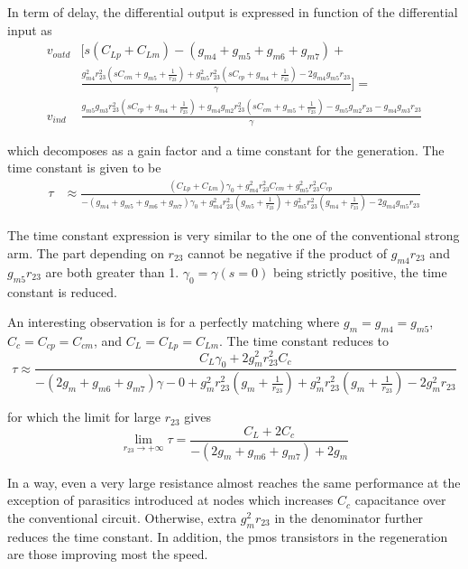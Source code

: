 In term of delay, the differential output is expressed in function of the differential input as
\small
\begin{align}
    v_{outd} & \Biggl[ s \left( C_{Lp}+C_{Lm}\right) -(g_{m4}+g_{m5}+g_{m6}+g_{m7})+ \\
    & \frac{g_{m4}^2 r_{23}^2 \left( sC_{cm}+g_{m5}+\frac{1}{r_{23}} \right) +g_{m5}^2 r_{23}^2 \left( sC_{cp}+g_{m4}+\frac{1}{r_{23}} \right) - 2g_{m4}g_{m5}r_{23}}{\gamma} \Biggr] = \nonumber \\
    v_{ind} & \frac{g_{m5}g_{m3}r_{23}^2 \left( sC_{cp}+g_{m4}+\frac{1}{r_{23}} \right) +g_{m4}g_{m2}r_{23}^2 \left( sC_{cm}+g_{m5}+\frac{1}{r_{23}} \right) -g_{m5}g_{m2}r_{23}-g_{m4}g_{m3}r_{23}}{\gamma} \nonumber
\end{align}
\normalsize

which decomposes as a gain factor and a time constant for the generation. The time constant is given to be
\begin{align}
\tau &\approx \frac{\left(C_{Lp}+C_{Lm}\right)\gamma_0+g_{m4}^2r_{23}^2C_{cm}+g_{m5}^2r_{23}^2C_{cp}}{-(g_{m4}+g_{m5}+g_{m6}+g_{m7})\gamma_0+g_{m4}^2 r_{23}^2 \left(g_{m5}+\frac{1}{r_{23}} \right) +g_{m5}^2 r_{23}^2 \left(g_{m4}+\frac{1}{r_{23}} \right) - 2g_{m4}g_{m5}r_{23}}
\end{align}

The time constant expression is very similar to the one of the conventional strong arm. The part depending on \(r_{23}\) cannot be negative if the product of \(g_{m4}r_{23}\) and \(g_{m5}r_{23}\) are both greater than 1. \(\gamma_0 = \gamma(s=0) \) being strictly positive, the time constant is reduced.

An interesting observation is for a perfectly matching where \(g_{m}=g_{m4}=g_{m5}\), \(C_c=C_{cp}=C_{cm}\), and \(C_L=C_{Lp}=C_{Lm}\). The time constant reduces to
\[
    \tau \approx \frac{C_L\gamma_0+2g_{m}^2r_{23}^2C_c}{-(2g_{m}+g_{m6}+g_{m7})\gamma-0+g_{m}^2 r_{23}^2 \left(g_{m}+\frac{1}{r_{23}} \right) +g_{m}^2 r_{23}^2 \left(g_{m}+\frac{1}{r_{23}} \right) - 2g_{m}^2r_{23}}
\] 

for which the limit for large \(r_{23}\) gives
\[
    \lim_{r_{23}\to+\infty} \tau = \frac{C_L+2C_c}{-(2g_{m}+g_{m6}+g_{m7})+2g_{m}}
\]

In a way, even a very large resistance almost reaches the same performance at the exception of parasitics introduced at nodes which increases \(C_c\) capacitance over the conventional circuit. Otherwise, extra \(g_{m}^2r_{23}\) in the denominator further reduces the time constant. In addition, the pmos transistors in the regeneration are those improving most the speed.

